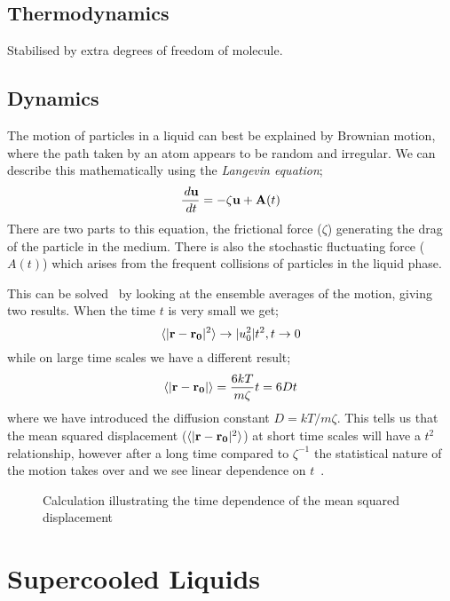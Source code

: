 \subsection{Thermodynamics}
Stabilised by extra degrees of freedom of molecule.

\subsection{Dynamics}
The motion of particles in a liquid can best be explained by Brownian motion, where the path taken by an atom appears to be random and irregular. We can describe this mathematically using the \emph{Langevin equation};
\begin{equation}
    \frac{\,d \mathbf{u}}{\,d t} = - \zeta \mathbf{u} + \mathbf{A}(t)
\end{equation}
There are two parts to this equation, the frictional force ($\zeta$) generating the drag of the particle in the medium. There is also the stochastic fluctuating force ($A(t)$) which arises from the frequent collisions of particles in the liquid phase.

This can be solved~\cite{mcquarrie:75} by looking at the ensemble averages of the motion, giving two results. When the time $t$ is very small we get;
\begin{equation}
    \langle | \mathbf{r} - \mathbf{r_0}|^2 \rangle \rightarrow |u_0^2|t^2,   t \rightarrow 0
\end{equation}
while on large time scales we have a different result;
\begin{equation}
    \langle | \mathbf{r} - \mathbf{r_0} | \rangle = \frac{6kT}{m\zeta} t = 6Dt
\end{equation}
where we have introduced the diffusion constant $D = kT/m\zeta$. This tells us that the mean squared displacement ($\langle | \mathbf{r} - \mathbf{r_0} |^2 \rangle$) at short time scales will have a $t^2$ relationship, however after a long time compared to $\zeta^{-1}$ the statistical nature of the motion takes over and we see linear dependence on $t$~.

\begin{figure}
    \label{fig:MSD}
    \caption{Calculation illustrating the time dependence of the mean squared displacement}
\end{figure}


\section{Supercooled Liquids}

